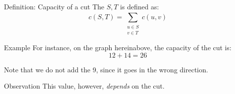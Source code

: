 \documentclass[a4paper]{article}
\begin{document}
\begin{parag}{Definition: Capacity of a cut}
    The  $S, T$ is defined as: 
    \[c\left(S, T\right) = \sum_{\substack{u \in S \\ v \in T}}^{} c\left(u, v\right)\]
    
    \begin{subparag}{Example}
        For instance, on the graph hereinabove, the capacity of the cut is: 
        \[12 + 14 = 26\]
        
        Note that we do not add the 9, since it goes in the wrong direction.
    \end{subparag}

    \begin{subparag}{Observation}
        This value, however, \textit{depends} on the cut.
    \end{subparag}
\end{parag}
\end{document}

